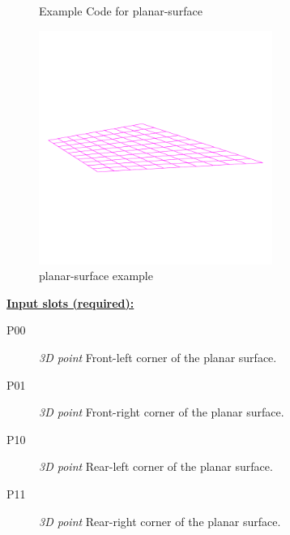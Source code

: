 \documentclass [11pt]{book}
\begin{document}
\begin{itemize}
\begin{figure}
\begin{lrbox}{\boxedverb}
\begin{minipage}{\linewidth}
{\begin{verbatim}
\end{verbatim}}
\end{minipage}
\end{lrbox}
\fbox{\usebox{\boxedverb}}

\caption{Example Code for planar-surface}

\label{fig:example-code-planar-surface}

\end{figure}

\begin{figure}
\begin{center}
\includegraphics[width=3in,height=3in]{../images/example-planar-surface.pdf}
\end{center}

\caption{planar-surface example}

\label{fig:planar-surface}

\end{figure}





\textbf{
\underline{Input slots (required):}}

\begin{description}

\item [P00]
\emph{3D point} Front-left  corner of the planar surface.


\item [P01]
\emph{3D point} Front-right corner of the planar surface.


\item [P10]
\emph{3D point} Rear-left  corner of the planar surface.


\item [P11]
\emph{3D point} Rear-right corner of the planar surface.



\end{description}
\end{itemize}
\end{document}
